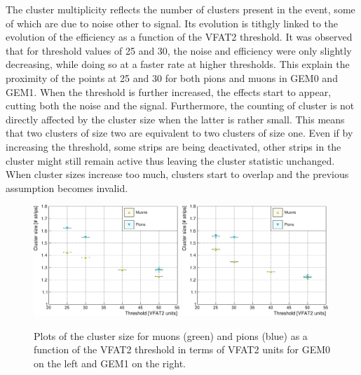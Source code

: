       The cluster multiplicity reflects the number of clusters present in the event, some of which are due to noise other to signal. Its evolution is tithgly linked to the evolution of the efficiency as a function of the VFAT2 threshold. It was observed that for threshold values of 25 and 30, the noise and efficiency were only slightly decreasing, while doing so at a faster rate at higher thresholds. This explain the proximity of the points at 25 and 30 for both pions and muons in GEM0 and GEM1. When the threshold is further increased, the effects start to appear, cutting both the noise and the signal. Furthermore, the counting of cluster is not directly affected by the cluster size when the latter is rather small. This means that two clusters of size two are equivalent to two clusters of size one. Even if by increasing the threshold, some strips are being deactivated, other strips in the cluster might still remain active thus leaving the cluster statistic unchanged. When cluster sizes increase too much, clusters start to overlap and the previous assumption becomes invalid. \\


      \begin{figure}[h!]
        \centering
        \includegraphics[width=0.49\textwidth]{img/plots/cClusterSize_Threshold_GEM0-crop}
        \includegraphics[width=0.49\textwidth]{img/plots/cClusterSize_Threshold_GEM1-crop}
        \caption{Plots of the cluster size for muons (green) and pions (blue) as a function of the VFAT2 threshold in terms of VFAT2 units for GEM0 on the left and GEM1 on the right.}
        \label{fig:II-3-data-clu-size}
      \end{figure}

